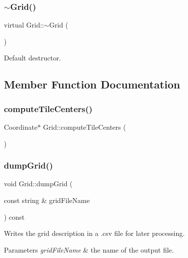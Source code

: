 \subsubsection{\texorpdfstring{$\sim$\+Grid()}{~Grid()}}
{\footnotesize\ttfamily virtual Grid\+::$\sim$\+Grid (\begin{DoxyParamCaption}{ }\end{DoxyParamCaption})\hspace{0.3cm}{\ttfamily [virtual]}}

Default destructor. 

\subsection{Member Function Documentation}
\mbox{\label{class_grid_a8948d61db8ba1bda2260590677eaaa01}} 
\subsubsection{\texorpdfstring{compute\+Tile\+Centers()}{computeTileCenters()}}
{\footnotesize\ttfamily Coordinate$\ast$ Grid\+::compute\+Tile\+Centers (\begin{DoxyParamCaption}{ }\end{DoxyParamCaption})\hspace{0.3cm}{\ttfamily [private]}}

\mbox{\label{class_grid_a0024d8d3cdd7b95f9fd61205ce8b9dea}} 
\subsubsection{\texorpdfstring{dump\+Grid()}{dumpGrid()}}
{\footnotesize\ttfamily void Grid\+::dump\+Grid (\begin{DoxyParamCaption}\item[{const string \&}]{grid\+File\+Name }\end{DoxyParamCaption}) const}

Writes the grid description in a .csv file for later processing. 
\begin{DoxyParams}{Parameters}
{\em grid\+File\+Name} & the name of the output file. \\
\hline
\end{DoxyParams}
\mbox{\label{class_grid_ab0a71c762b6c33e6fa2fd49dde38228b}} 
